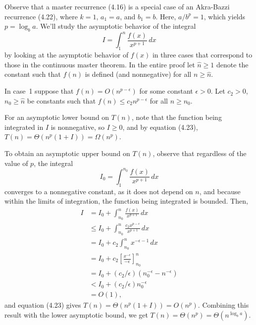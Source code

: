 
Observe that a master recurrence (4.16) is a special case of an Akra-Bazzi recurrence (4.22), where $k=1$, $a_1=a$, and $b_1=b$.
Here, $a/b^p=1$, which yields $p=\log_ba$.
We'll study the asymptotic behavior of the integral
\[
    I = \int_1^n\frac{f(x)}{x^{p+1}}\,dx
\]
by looking at the asymptotic behavior of $f(x)$ in three cases that correspond to those in the continuous master theorem.
In the entire proof let $\widehat{n}\ge1$ denote the constant such that $f(n)$ is defined (and nonnegative) for all $n\ge\widehat{n}$.

In case~1 suppose that $f(n)=O(n^{p-\epsilon})$ for some constant $\epsilon>0$.
Let $c_2>0$, $n_0\ge\widehat{n}$ be constants such that $f(n)\le c_2n^{p-\epsilon}$ for all $n\ge n_0$.

For an asymptotic lower bound on $T(n)$, note that the function being integrated in $I$ is nonnegative, so $I\ge0$, and by equation (4.23), $T(n)=\Theta(n^p(1+I))=\Omega(n^p)$.

To obtain an asymptotic upper bound on $T(n)$, observe that regardless of the value of $p$, the integral
\[
    I_0 = \int_1^{n_0}\frac{f(x)}{x^{p+1}}\,dx
\]
converges to a nonnegative constant, as it does not depend on $n$, and because within the limits of integration, the function being integrated is bounded.
Then,
\begin{align*}
    I &= I_0+\int_{n_0}^n\frac{f(x)}{x^{p+1}}\,dx \\[1mm]
    &\le I_0+\int_{n_0}^n\frac{c_2x^{p-\epsilon}}{x^{p+1}}\,dx \\[1mm]
    &= I_0+c_2\int_{n_0}^nx^{-\epsilon-1}\,dx \\[1mm]
    &= I_0+c_2\left[\frac{x^{-\epsilon}}{-\epsilon}\right]_{n_0}^n \\[1mm]
    &= I_0+(c_2/\epsilon)(n_0^{-\epsilon}-n^{-\epsilon}) \\
    &< I_0+(c_2/\epsilon)n_0^{-\epsilon} \\
    &= O(1),
\end{align*}
and equation (4.23) gives $T(n)=\Theta(n^p(1+I))=O(n^p)$.
Combining this result with the lower asymptotic bound, we get $T(n)=\Theta(n^p)=\Theta(n^{\log_ba})$.

